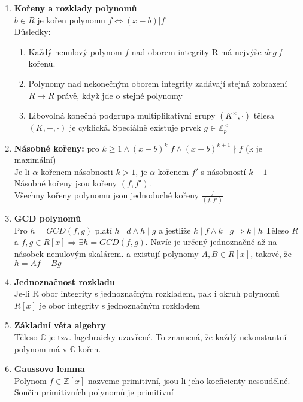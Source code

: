\documentclass[12pt,a4paper]{article}
\begin{document}
\begin{enumerate}
			\item \textbf{Kořeny a rozklady polynomů}\\
				$b \in R$ je kořen polynomu $f \Leftrightarrow (x-b)|f$\\
				Důsledky:
				\begin{enumerate}
				 	\item Každý nenulový polynom $f$ nad oborem integrity R má nejvýše $deg~f$ kořenů.\\
					\item Polynomy nad nekonečným oborem integrity zadávají stejná zobrazení $R \rightarrow R$ právě, když jde o stejné polynomy
					\item Libovolná konečná podgrupa multiplikativní grupy $(K^{\times},\cdot)$ tělesa $(K,+,\cdot)$ je cyklická. Speciálně existuje prvek $g \in \mathbb{Z}^{\times}_{p}$
				\end{enumerate}
			\item \textbf{Násobné kořeny:} pro $k \geq 1 \land (x-b)^k|f \land (x-b)^{k+1} \nmid f$  (k je maximální)\\
					Je li $\alpha$ kořenem násobnosti $k >1$, je $\alpha$ kořenem $f'$ s násobností $k-1$\\
					Násobné kořeny jsou kořeny $(f,f')$.\\ Všechny kořeny polynomu jsou jednoduché kořeny $\frac{f}{(f,f')}$
			\item \textbf{GCD polynomů}\\
					Pro $h=GCD(f,g)$ platí $h \mid d \land h \mid g$ a jestliže $k \mid f \land k \mid g \Rightarrow k \mid h$
					Těleso $R$ a $f,g \in R[x] \Rightarrow \exists h=GCD(f,g)$. Navíc je určený jednoznačně až na násobek nenulovým skalárem. a existují polynomy $A, B \in R[x]$, takové, že $h=Af+Bg$
			\item \textbf{Jednoznačnost rozkladu}\\
					Je-li R obor integrity s jednoznačným rozkladem, pak i okruh polynomů $R[x]$ je obor integrity s jednoznačným rozkladem
			\item \textbf{Základní věta algebry}\\
					Těleso $\mathbb{C}$ je tzv. lagebraicky uzavřené. To znamená, že každý nekonstantní polynom má v $\mathbb{C}$ kořen.
			\item \textbf{Gaussovo lemma}\\
					Polynom $f \in \mathbb{Z}[x]$ nazveme primitivní, jsou-li jeho koeficienty nesoudělné.\\
					Součin primitivních polynomů je primitivní\\

\end{enumerate}
\end{document}

